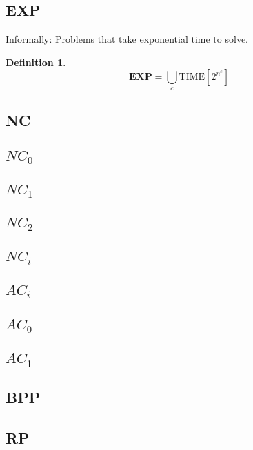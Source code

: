 \documentclass[]{article}
\theoremstyle{definition}
\newtheorem{definition}{Definition}[section]
\begin{document}
\subsection{EXP}
Informally: Problems that take exponential time to solve.
\begin{definition}
	$$\textbf{EXP}= \bigcup_c \hyperref[sec:time]{\text{TIME}[2^{n^c}]}$$
\end{definition}
\iffalse
\subsection{NC}

\subsection{$NC_0$}

\subsection{$NC_1$}

\subsection{$NC_2$}

\subsection{$NC_i$}

\subsection{$AC_i$}

\subsection{$AC_0$}

\subsection{$AC_1$}

\subsection{BPP}

\subsection{RP}
\end{document}
